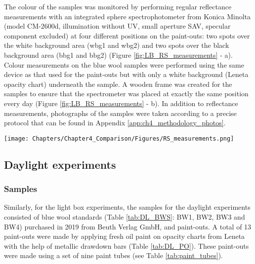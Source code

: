 The colour of the samples was monitored by performing regular reflectance measurements with an integrated sphere spectrophotometer from Konica Minolta (model CM-2600d, illumination without \gls{UV}, small aperture SAV, specular component excluded) at four different positions on the paint-outs: two spots over the white background area (\gls{wbg1} and \gls{wbg2}) and two spots over the black background area (\gls{bbg1} and \gls{bbg2}) (Figure \ref{fig:LB_RS_measurements} - a). Colour measurements on the blue wool samples were performed using the same device as that used for the paint-outs but with only a white background (Leneta opacity chart) underneath the sample. A wooden frame was created for the samples to ensure that the spectrometer was placed at exactly the same position every day (Figure \ref{fig:LB_RS_measurements} - b). In addition to reflectance measurements, photographs of the samples were taken according to a precise protocol that can be found in Appendix \ref{app:ch4_methodology_photos}.\\

\begin{figure*}[!h]
\centering
\texttt{[image: Chapters/Chapter4\_Comparison/Figures/RS\_measurements.png]}
\caption[\hspace{0.3cm}Set-up of the reflectance measurements]{Set-up of the reflectance measurements: (a) measurement spots on a paint-out ; (b) measurement on a paint-out with the Konica Minolta spectrophotometer.}
\label{fig:LB_RS_measurements}
\end{figure*}

\newpage
\subsection{Daylight experiments}
\label{sec:DL_methodology}

\subsubsection{Samples}

Similarly, for the light box experiments, the samples for the daylight experiments consisted of blue wool standards (Table \ref{tab:DL_BWS}: BW1, BW2, BW3 and BW4) purchased in 2019 from Beuth Verlag GmbH, and paint-outs. A total of 13 paint-outs were made by applying fresh oil paint on opacity charts from Leneta with the help of metallic drawdown bars (Table \ref{tab:DL_PO}). These paint-outs were made using a set of nine paint tubes (see Table \ref{tab:paint_tubes}).

